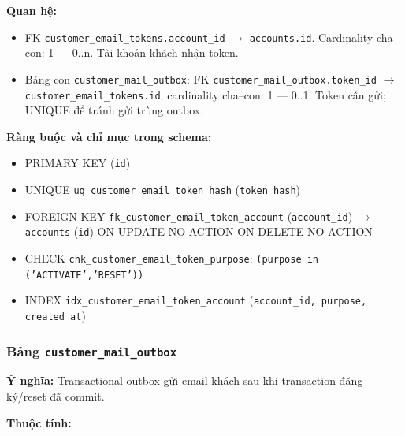 \textbf{Quan hệ:}

\begin{itemize}

\item FK \texttt{customer\_email\_tokens.account\_id} $\rightarrow$ \texttt{accounts.id}. Cardinality cha--con: 1 — 0..n. Tài khoản khách nhận token.

\item Bảng con \texttt{customer\_mail\_outbox}: FK \texttt{customer\_mail\_outbox.token\_id} $\rightarrow$ \texttt{customer\_email\_tokens.id}; cardinality cha--con: 1 — 0..1. Token cần gửi; UNIQUE để tránh gửi trùng outbox.

\end{itemize}

\textbf{Ràng buộc và chỉ mục trong schema:}

\begin{itemize}

\item PRIMARY KEY (\texttt{id})

\item UNIQUE \texttt{uq\_customer\_email\_token\_hash} (\texttt{token\_hash})

\item FOREIGN KEY \texttt{fk\_customer\_email\_token\_account} (\texttt{account\_id}) $\rightarrow$ \texttt{accounts} (\texttt{id}) ON UPDATE NO ACTION ON DELETE NO ACTION

\item CHECK \texttt{chk\_customer\_email\_token\_purpose}: \texttt{(purpose in ('ACTIVATE','RESET'))}

\item INDEX \texttt{idx\_customer\_email\_token\_account} (\texttt{account\_id, purpose, created\_at})

\end{itemize}

\subsubsection{Bảng \texttt{customer\_mail\_outbox}}

\textbf{Ý nghĩa:} Transactional outbox gửi email khách sau khi transaction đăng ký/reset đã commit.\par

\textbf{Thuộc tính:}

